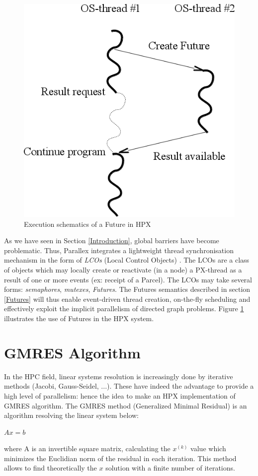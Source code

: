 \documentclass{llncs}
\begin{document}
\begin{figure}[h]
\begin{center}
\includegraphics[scale=0.4]{Images/Im5.png}
\end{center}
\caption{Execution schematics of a Future in HPX}
\label{hpxthread}
\end{figure}

As we have seen in Section \ref{Introduction}, global barriers have become
problematic. Thus, Parallex integrates a lightweight thread synchronisation
mechanism in the form of \emph{LCOs} (Local Control Objects) \cite{Parallex}.
The LCOs are a class of objects which may locally create or reactivate (in a
node) a PX-thread as a result of one or more events (ex: receipt of a Parcel).
The LCOs may take several forms: \emph{semaphores}, \emph{mutexes},
\emph{Futures}. The Futures semantics described in section \ref{Futures} will
thus enable event-driven thread creation, on-the-fly scheduling and effectively
exploit the implicit parallelism of directed graph problems. Figure
\ref{hpxthread} illustrates the use of Futures in the HPX system.

\section{GMRES Algorithm}\label{GMRES}
In the HPC field, linear systems resolution is increasingly done by iterative
methods \cite{Methodes} (Jacobi, Gauss-Seidel, ...). These have indeed the
advantage to provide a high level of parallelism: hence the idea to make an HPX
implementation of GMRES algorithm. The GMRES method (Generalized Minimal
Residual) \cite{GMRES} is an algorithm resolving the linear system below:
\begin{center}
  $Ax=b$
\end{center}
where A is an invertible square matrix, calculating the $x^{(k)}$ value which
minimizes the Euclidian norm of the residual in each iteration. This method
allows to find theoretically the $x$ solution with a finite number of iterations.
\end{document}
